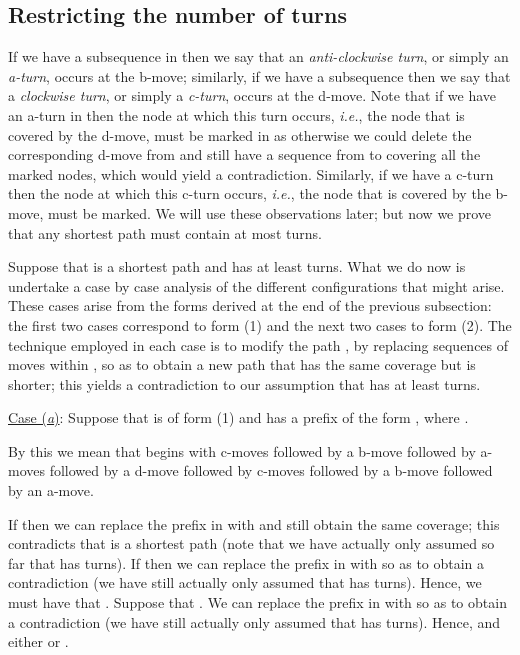 \documentclass{article}
\newcounter{fig}
\begin{document}
\subsection{Restricting the number of turns} \label{sec:turns}

If we have a subsequence  in  then we say that an \emph{anti-clockwise turn}, or simply an \emph{a-turn}, occurs at the b-move; similarly, if we have a subsequence  then we say that a \emph{clockwise turn}, or simply a \emph{c-turn}, occurs at the d-move. Note that if we have an a-turn in  then the node at which this turn occurs, \emph{i.e.}, the node that is covered by the d-move, must be marked in  as otherwise we could delete the corresponding d-move from  and still have a sequence from  to  covering all the marked nodes, which would yield a contradiction. Similarly, if we have a c-turn then the node at which this c-turn occurs, \emph{i.e.}, the node that is covered by the b-move, must be marked. We will use these observations later; but now we prove that any shortest path  must contain at most  turns. 

Suppose that  is a shortest path and has at least  turns. What we do now is undertake a case by case analysis of the different configurations that might arise. These cases arise from the forms derived at the end of the previous subsection: the first two cases correspond to form (1) and the next two cases to form (2). The technique employed in each case is to modify the path , by replacing sequences of moves within , so as to obtain a new path that has the same coverage but is shorter; this yields a contradiction to our assumption that  has at least  turns.\smallskip

\noindent\underline{Case (\emph{a\/})}: Suppose that  is of form (1) and has a prefix  of the form , where .\smallskip

\noindent By this we mean that  begins with  c-moves followed by a b-move followed by  a-moves followed by a d-move followed by  c-moves followed by a b-move followed by an a-move. 

If  then we can replace the prefix  in  with  and still obtain the same coverage; this contradicts that  is a shortest path (note that we have actually only assumed so far that  has  turns). If  then we can replace the prefix  in  with  so as to obtain a contradiction (we have still actually only assumed that  has  turns). Hence, we must have that . Suppose that . We can replace the prefix  in  with  so as to obtain a contradiction (we have still actually only assumed that  has  turns). Hence,  and either  or . 
\end{document}
